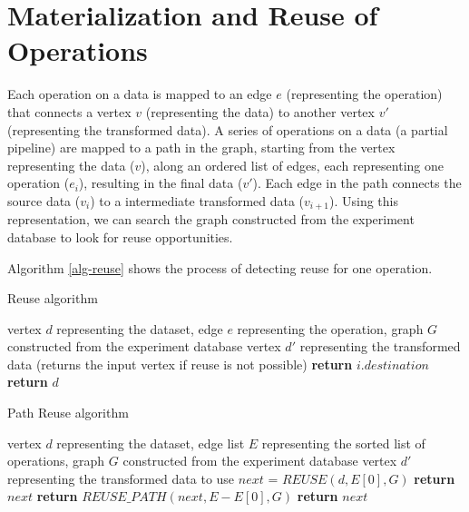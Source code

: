 \section{Materialization and Reuse of Operations}\label{sec-materializaiton-and-reuse}
Each operation on a data is mapped to an edge $e$ (representing the operation) that connects a vertex $v$ (representing the data) to another vertex $v'$ (representing the transformed data).
A series of operations on a data (a partial pipeline) are mapped to a path in the graph, starting from the vertex representing the data ($v$), along an ordered list of edges, each representing one operation ($e_i$), resulting in the final data ($v'$). 
Each edge in the path connects the source data ($v_i$) to a intermediate transformed data ($v_{i+1}$).
Using this representation, we can search the graph constructed from the experiment database to look for reuse opportunities.

Algorithm \ref{alg-reuse} shows the process of detecting reuse for one operation.
\begin{algorithm}
\caption{Reuse algorithm}\label{alg-reuse}
\begin{algorithmic}[1]
\Require vertex $d$ representing the dataset, edge $e$ representing the operation, graph $G$ constructed from the experiment database
\Ensure vertex $d'$ representing the transformed data (returns the input vertex if reuse is not possible)
			 	 
			 		 \State \textbf{return} $i.destination$ 
			 	\EndIf
		\EndFor
	\EndIf
   \State \textbf{return} $d$ 
\EndFunction
\end{algorithmic}
\end{algorithm}

 
\begin{algorithm}
\caption{Path Reuse algorithm}\label{alg-reuse-partial_pipeline}
\begin{algorithmic}[1]
\Require vertex $d$ representing the dataset, edge list $E$ representing the sorted list of operations, graph $G$ constructed from the experiment database
\Ensure vertex $d'$ representing the transformed data to use
	\State $next$ = $REUSE(d, E[0],G)$
		\State \textbf{return} $next$
		\State \textbf{return} $REUSE\_PATH(next, E - E[0], G)$
	\Else
		\State \textbf{return} $next$
	\EndIf
\EndFunction
\end{algorithmic}
\end{algorithm}
 
